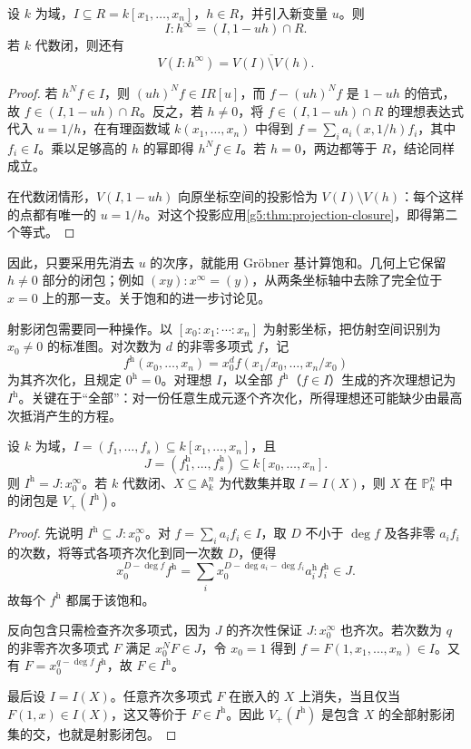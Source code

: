 \begin{proposition}\label{g5:prop:saturation-elimination}
	设 \(k\) 为域，\(I\subseteq R=k[x_1,\ldots,x_n]\)，\(h\in R\)，并引入新变量 \(u\)。则
	\[
		I:h^\infty=(I,1-uh)\cap R.
	\]
	若 \(k\) 代数闭，则还有
	\[
		V(I:h^\infty)=\overline{V(I)\setminus V(h)}.
	\]
\end{proposition}
\begin{proof}
	若 \(h^Nf\in I\)，则 \((uh)^Nf\in I R[u]\)，而 \(f-(uh)^Nf\) 是 \(1-uh\) 的倍式，故 \(f\in(I,1-uh)\cap R\)。反之，若 \(h\ne0\)，将 \(f\in(I,1-uh)\cap R\) 的理想表达式代入 \(u=1/h\)，在有理函数域 \(k(x_1,\ldots,x_n)\) 中得到 \(f=\sum_i a_i(x,1/h)f_i\)，其中 \(f_i\in I\)。乘以足够高的 \(h\) 的幂即得 \(h^Nf\in I\)。若 \(h=0\)，两边都等于 \(R\)，结论同样成立。

	在代数闭情形，\(V(I,1-uh)\) 向原坐标空间的投影恰为 \(V(I)\setminus V(h)\)：每个这样的点都有唯一的 \(u=1/h\)。对这个投影应用\cref{g5:thm:projection-closure}，即得第二个等式。
\end{proof}

因此，只要采用先消去 \(u\) 的次序，就能用 Gröbner 基计算饱和。几何上它保留 \(h\ne0\) 部分的闭包；例如 \((xy):x^\infty=(y)\)，从两条坐标轴中去除了完全位于 \(x=0\) 上的那一支。关于饱和的进一步讨论见\cite[第4章第4节]{CoxLittleOShea2015}。

射影闭包需要同一种操作。以 \([x_0:x_1:\cdots:x_n]\) 为射影坐标，把仿射空间识别为 \(x_0\ne0\) 的标准图。对次数为 \(d\) 的非零多项式 \(f\)，记
\[
	 f^{\mathrm h}(x_0,\ldots,x_n)=x_0^d f(x_1/x_0,\ldots,x_n/x_0)
\]
为其齐次化，且规定 \(0^{\mathrm h}=0\)。对理想 \(I\)，以全部 \(f^{\mathrm h}\)（\(f\in I\)）生成的齐次理想记为 \(I^{\mathrm h}\)。关键在于“全部”：对一份任意生成元逐个齐次化，所得理想还可能缺少由最高次抵消产生的方程。

\begin{proposition}\label{g5:prop:projective-homogenization}
	设 \(k\) 为域，\(I=(f_1,\ldots,f_s)\subseteq k[x_1,\ldots,x_n]\)，且
	\[
		J=(f_1^{\mathrm h},\ldots,f_s^{\mathrm h})\subseteq k[x_0,\ldots,x_n].
	\]
	则 \(I^{\mathrm h}=J:x_0^\infty\)。若 \(k\) 代数闭、\(X\subseteq\mathbb A_k^n\) 为代数集并取 \(I=I(X)\)，则 \(X\) 在 \(\mathbb P_k^n\) 中的闭包是 \(V_+(I^{\mathrm h})\)。
\end{proposition}
\begin{proof}
	先说明 \(I^{\mathrm h}\subseteq J:x_0^\infty\)。对 \(f=\sum_i a_if_i\in I\)，取 \(D\) 不小于 \(\deg f\) 及各非零 \(a_if_i\) 的次数，将等式各项齐次化到同一次数 \(D\)，便得
	\[
		x_0^{D-\deg f}f^{\mathrm h}
		=\sum_i x_0^{D-\deg a_i-\deg f_i}a_i^{\mathrm h}f_i^{\mathrm h}\in J.
	\]
	故每个 \(f^{\mathrm h}\) 都属于该饱和。

	反向包含只需检查齐次多项式，因为 \(J\) 的齐次性保证 \(J:x_0^\infty\) 也齐次。若次数为 \(q\) 的非零齐次多项式 \(F\) 满足 \(x_0^NF\in J\)，令 \(x_0=1\) 得到 \(f=F(1,x_1,\ldots,x_n)\in I\)。又有 \(F=x_0^{q-\deg f}f^{\mathrm h}\)，故 \(F\in I^{\mathrm h}\)。

	最后设 \(I=I(X)\)。任意齐次多项式 \(F\) 在嵌入的 \(X\) 上消失，当且仅当 \(F(1,x)\in I(X)\)，这又等价于 \(F\in I^{\mathrm h}\)。因此 \(V_+(I^{\mathrm h})\) 是包含 \(X\) 的全部射影闭集的交，也就是射影闭包。
\end{proof}

